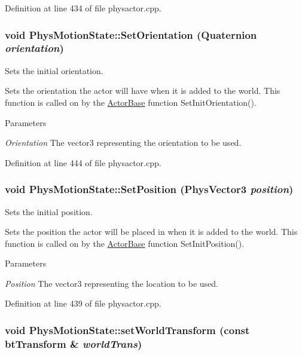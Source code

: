 Definition at line 434 of file physactor.cpp.

\hypertarget{classPhysMotionState_a3de0041d9fd078dcdea0db97a1c9e3e2}{
\subsubsection[{SetOrientation}]{\setlength{\rightskip}{0pt plus 5cm}void PhysMotionState::SetOrientation ({\bf Quaternion} {\em orientation})}}
\label{d2/d14/classPhysMotionState_a3de0041d9fd078dcdea0db97a1c9e3e2}


Sets the initial orientation. 

Sets the orientation the actor will have when it is added to the world. This function is called on by the \hyperlink{classActorBase}{ActorBase} function SetInitOrientation(). 
\begin{DoxyParams}{Parameters}
\item[{\em Orientation}]The vector3 representing the orientation to be used. \end{DoxyParams}


Definition at line 444 of file physactor.cpp.

\hypertarget{classPhysMotionState_aa2fa4f107147626cd33d42fd3fbe178b}{
\subsubsection[{SetPosition}]{\setlength{\rightskip}{0pt plus 5cm}void PhysMotionState::SetPosition ({\bf PhysVector3} {\em position})}}
\label{d2/d14/classPhysMotionState_aa2fa4f107147626cd33d42fd3fbe178b}


Sets the initial position. 

Sets the position the actor will be placed in when it is added to the world. This function is called on by the \hyperlink{classActorBase}{ActorBase} function SetInitPosition(). 
\begin{DoxyParams}{Parameters}
\item[{\em Position}]The vector3 representing the location to be used. \end{DoxyParams}


Definition at line 439 of file physactor.cpp.

\hypertarget{classPhysMotionState_a57c23b922e2c5e8af87dc1318796ec8b}{
\subsubsection[{setWorldTransform}]{\setlength{\rightskip}{0pt plus 5cm}void PhysMotionState::setWorldTransform (const btTransform \& {\em worldTrans})}}
\label{d2/d14/classPhysMotionState_a57c23b922e2c5e8af87dc1318796ec8b}


